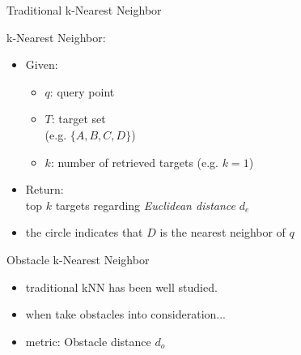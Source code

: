 \begin{frame}{Traditional k-Nearest Neighbor}
\begin{minipage}{.5\textwidth}
\small k-Nearest Neighbor:
\begin{itemize}
    \item<1-> \small Given:
    \begin{itemize}
        \item<2-> \small $q$: query point
        \item<3-> \small $T$: target set\\\tiny(e.g. $\{A,B,C,D\}$)
        \item<4-> \small $k$: number of retrieved targets \tiny(e.g. $k=1$)
    \end{itemize}
    \item<5-> \small Return:\\top $k$ targets regarding \textit{Euclidean distance} $d_e$
    \item<6-> \small the circle indicates that $D$ is the nearest neighbor of $q$
\end{itemize}
\end{minipage}%
\begin{minipage}{.5\textwidth}
\begin{adjustbox}{max totalsize={.9\textwidth}{.9\textheight}, right}

\end{adjustbox}
\end{minipage}
\end{frame}

\begin{frame}{Obstacle k-Nearest Neighbor}
\begin{minipage}{.5\textwidth}
\begin{itemize}
    \item \small traditional kNN has been well studied.
    \item \small when take obstacles into consideration...
    \item \small metric: Obstacle distance $d_o$
\end{itemize}
\end{minipage}%
\begin{minipage}{.5\textwidth}
\begin{adjustbox}{max totalsize={.9\textwidth}{.9\textheight}, right}
 {}
 {}
\end{adjustbox}
\end{minipage}
\end{frame}

